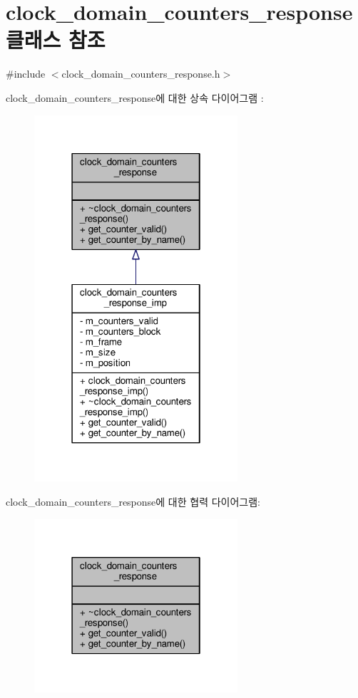 \hypertarget{classavdecc__lib_1_1clock__domain__counters__response}{}\section{clock\+\_\+domain\+\_\+counters\+\_\+response 클래스 참조}
\label{classavdecc__lib_1_1clock__domain__counters__response}


{\ttfamily \#include $<$clock\+\_\+domain\+\_\+counters\+\_\+response.\+h$>$}



clock\+\_\+domain\+\_\+counters\+\_\+response에 대한 상속 다이어그램 \+: 
\nopagebreak
\begin{figure}[H]
\begin{center}
\leavevmode
\includegraphics[width=214pt]{classavdecc__lib_1_1clock__domain__counters__response__inherit__graph}
\end{center}
\end{figure}


clock\+\_\+domain\+\_\+counters\+\_\+response에 대한 협력 다이어그램\+:
\nopagebreak
\begin{figure}[H]
\begin{center}
\leavevmode
\includegraphics[width=214pt]{classavdecc__lib_1_1clock__domain__counters__response__coll__graph}
\end{center}
\end{figure}
